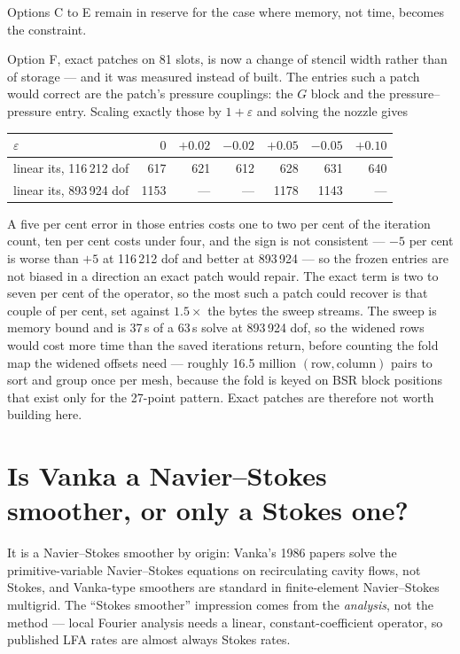 \documentclass[11pt,a4paper]{article}
\begin{document}
Options C to E remain in reserve for the case where memory, not time, becomes the constraint.

Option F, exact patches on 81 slots, is now a change of stencil width rather than of storage ---
and it was measured instead of built. The entries such a patch would correct are the patch's
pressure couplings: the $G$ block and the pressure--pressure entry. Scaling exactly those by
$1+\varepsilon$ and solving the nozzle gives

\begin{center}
\small
\begin{tabular}{@{}lrrrrrr@{}}
\toprule
$\varepsilon$ & $0$ & $+0.02$ & $-0.02$ & $+0.05$ & $-0.05$ & $+0.10$ \\
\midrule
linear its, 116\,212 dof & 617 & 621 & 612 & 628 & 631 & 640 \\
linear its, 893\,924 dof & 1153 & --- & --- & 1178 & 1143 & --- \\
\bottomrule
\end{tabular}
\end{center}

A five per cent error in those entries costs one to two per cent of the iteration count, ten per
cent costs under four, and the sign is not consistent --- $-5$ per cent is worse than $+5$ at
116\,212 dof and better at 893\,924 --- so the frozen entries are not biased in a direction an
exact patch would repair. The exact term is two to seven per cent of the operator, so the most
such a patch could recover is that couple of per cent, set against $1.5\times$ the bytes the
sweep streams. The sweep is memory bound and is 37\,s of a 63\,s solve at 893\,924 dof, so the
widened rows would cost more time than the saved iterations return, before counting the fold map
the widened offsets need --- roughly 16.5 million $(\text{row},\text{column})$ pairs to sort and
group once per mesh, because the fold is keyed on BSR block positions that exist only for the
27-point pattern. Exact patches are therefore not worth building here.

\section{Is Vanka a Navier--Stokes smoother, or only a Stokes one?}

It is a Navier--Stokes smoother by origin: Vanka's 1986 papers solve the primitive-variable
Navier--Stokes equations on recirculating cavity flows, not Stokes, and Vanka-type smoothers
are standard in finite-element Navier--Stokes multigrid. The ``Stokes smoother'' impression
comes from the \emph{analysis}, not the method --- local Fourier analysis needs a linear,
constant-coefficient operator, so published LFA rates are almost always Stokes rates.
\end{document}
